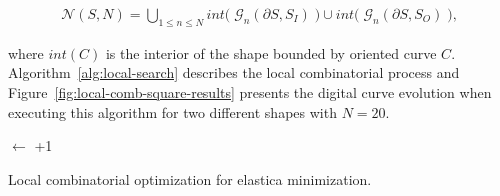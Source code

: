 \documentclass[runningheads]{llncs}
\begin{document}
\begin{align*}
	\mathcal{N}(S,N) = \bigcup_{1 \leq n \leq N} int \big( \; \mathcal{G}_{n}(\partial S, S_I) \;\big) \cup int \big( \; \mathcal{G}_{n}(\partial S, S_O) \; \big),
\end{align*}

where $int(C)$ is the interior of the shape bounded by oriented curve $C$. Algorithm~\ref{alg:local-search} describes the local combinatorial process and Figure~\ref{fig:local-comb-square-results} presents the digital curve evolution when executing this algorithm for two different shapes with $N=20$.


\begin{algorithm}
 
 \BlankLine
 \Delta $\longleftarrow$ \Tol+1\;
 \label{alg:local-search} 
 \caption{Local combinatorial optimization for elastica minimization.}
\end{algorithm}
\end{document}
